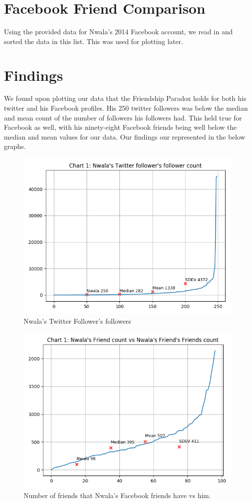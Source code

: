 \documentclass[11pt]{article}
\begin{document}
	\section{Facebook Friend Comparison}
	\hspace{10mm} Using the provided data for Nwala's 2014 Facebook account, we read in and sorted the data in this list. This was used for plotting later. 
	\section{Findings}
	\hspace{10mm} We found upon plotting our data that the Friendship Paradox holds for both his twitter and his Facebook profiles. His 250 twitter followers was below the median and mean count of the number of followers his followers had. This held true for Facebook as well, with his ninety-eight Facebook friends being well below the median and mean values for our data. Our findings our represented in the below graphs. 
	\begin{figure}[h!]
		\includegraphics[scale=0.5]{resources/twitter_followers.png}
		\caption{Nwala's Twitter Follower's followers}
	\end{figure}
	\begin{figure}[h!]
		\includegraphics[scale=0.5]{resources/fb.png}
		\caption{Number of friends that Nwala's Facebook friends have vs him.}
	\end{figure}
	
\end{document}

